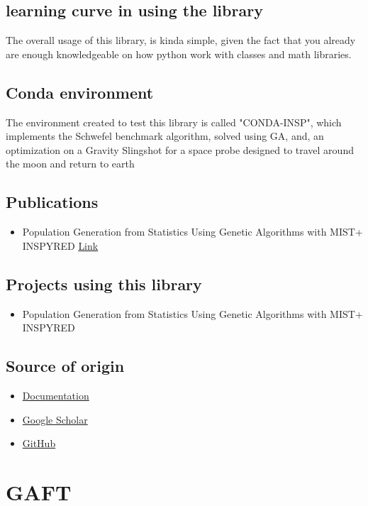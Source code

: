 \documentclass{article}
\begin{document}
\subsection{learning curve in using the library}
 The overall usage of this library, is kinda simple, given the fact that you already are enough knowledgeable on how python work with classes and math libraries. 
\subsection{Conda environment}
The environment created to test this library is called "CONDA-INSP", which implements the Schwefel benchmark algorithm, solved using GA, and, an optimization on a Gravity Slingshot for a space probe designed to travel around the moon and return to earth
\subsection{Publications}
\begin{itemize}
    \item   Population Generation from Statistics Using Genetic Algorithms with MIST+ INSPYRED \href{https://sites.google.com/site/jacobbarhak/home/MODSIM2014_MIST_INSPYRED_Paper_Submit_2014_03_10.pdf}{Link}
\end{itemize}
\subsection{Projects using this library}
\begin{itemize}
    \item    Population Generation from Statistics Using Genetic Algorithms with MIST+ INSPYRED
\end{itemize}
\subsection{Source of origin}
\begin{itemize}
    \item \href{https://pythonhosted.org/inspyred/index.html}{Documentation}
    \item \href{https://scholar.google.com/scholar?hl=it&as_sdt=02C5&q=pyeasyga&btnG=}{Google Scholar}
    \item \href{https://github.com/aarongarrett/inspyred}{GitHub}
\end{itemize}

\section{GAFT}
\end{document}
